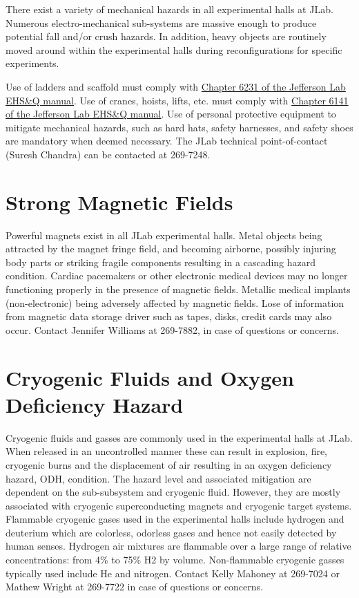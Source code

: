 	There exist a variety of mechanical hazards in all experimental halls at JLab. 
Numerous electro-mechanical sub-systems are massive enough to produce potential fall 
and/or crush hazards.  In addition, heavy objects are routinely moved around within 
the experimental halls during reconfigurations for specific experiments. 

Use of ladders and scaffold must comply 
with \href{http://www.jlab.org/ehs/ehsmanual/manual/6132.html}{Chapter 6231 of the 
Jefferson Lab EHS\&Q manual}.
Use of cranes, hoists, lifts, etc. must comply with
\href{http://www.jlab.org/ehs/ehsmanual/manual/6141.html}{Chapter 6141 of the 
Jefferson Lab EHS\&Q manual}. 
Use of personal protective equipment 
to mitigate mechanical hazards, such as hard hats, safety harnesses, and safety 
shoes are mandatory when deemed necessary.
The JLab technical point-of-contact (Suresh Chandra) can be contacted at 269-7248.

\section{Strong Magnetic Fields}

	Powerful magnets exist in all JLab experimental halls. Metal objects being attracted 
by the magnet fringe field, and becoming airborne, possibly injuring body parts or striking 
fragile components resulting in a cascading hazard condition. Cardiac pacemakers or other 
electronic medical devices may no longer functioning properly in the presence of magnetic fields. 
Metallic medical implants (non-electronic) being adversely affected by magnetic fields. Lose of 
information from magnetic data storage driver such as tapes, disks, credit cards may also occur. 
Contact Jennifer Williams at 269-7882, in case of questions or concerns.

\section{Cryogenic Fluids and Oxygen Deficiency Hazard}

	Cryogenic fluids and gasses are commonly used in the experimental halls at JLab. 
When released in an uncontrolled manner these can result in explosion, fire, cryogenic 
burns and the displacement of air resulting in an oxygen deficiency hazard, ODH, condition. The hazard level and 
associated mitigation are dependent on the sub-subsystem and cryogenic fluid. However, 
they are mostly associated with cryogenic superconducting magnets and cryogenic target systems. 
Flammable cryogenic gases used in the experimental halls include hydrogen and deuterium which 
are colorless, odorless gases and hence not easily detected by human senses. Hydrogen air 
mixtures are flammable over a large range of relative concentrations: from 4\% to 75\% H2 by volume. 
Non-flammable cryogenic gasses typically used include He and nitrogen.  Contact Kelly Mahoney at
269-7024 or Mathew Wright at 269-7722 in case of questions or concerns.

